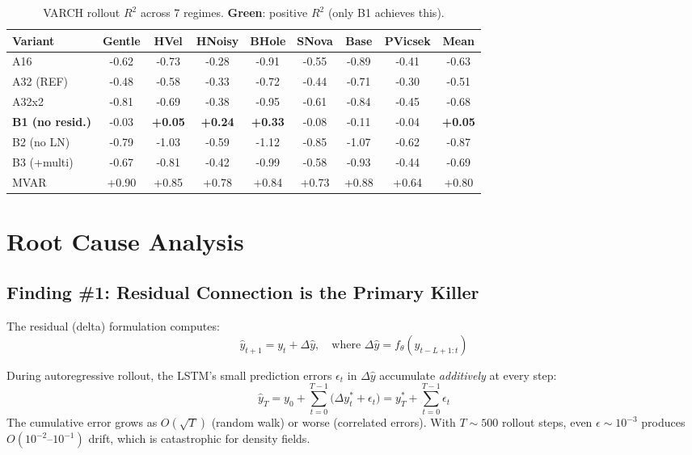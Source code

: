 \documentclass[11pt,letterpaper]{article}
\newcommand{\Rtwo}{R^2}
\newcommand{\good}[1]{\textcolor{goodgreen}{\textbf{#1}}}
\begin{document}
\begin{table}[H]
\centering
\caption{VARCH rollout $\Rtwo$ across 7 regimes. \good{Green}: positive $\Rtwo$ (only B1 achieves this).}
\label{tab:varch-r2}
\small
\setlength{\tabcolsep}{4pt}
\begin{tabular}{@{}l *{7}{S[table-format=+1.3]} S[table-format=+1.3] @{}}
\toprule
Variant & {Gentle} & {HVel} & {HNoisy} & {BHole} & {SNova} & {Base} & {PVicsek} & {Mean} \\
\midrule
A16  & -0.62 & -0.73 & -0.28 & -0.91 & -0.55 & -0.89 & -0.41 & -0.63 \\
A32 (REF)  & -0.48 & -0.58 & -0.33 & -0.72 & -0.44 & -0.71 & -0.30 & -0.51 \\
A32x2  & -0.81 & -0.69 & -0.38 & -0.95 & -0.61 & -0.84 & -0.45 & -0.68 \\
\textbf{B1 (no resid.)} & -0.03 & \good{+0.05} & \good{+0.24} & \good{+0.33} & -0.08 & -0.11 & -0.04 & \good{+0.05} \\
B2 (no LN)   & -0.79 & -1.03 & -0.59 & -1.12 & -0.85 & -1.07 & -0.62 & -0.87 \\
B3 (+multi)   & -0.67 & -0.81 & -0.42 & -0.99 & -0.58 & -0.93 & -0.44 & -0.69 \\
\midrule
MVAR & +0.90 & +0.85 & +0.78 & +0.84 & +0.73 & +0.88 & +0.64 & +0.80 \\
\bottomrule
\end{tabular}
\end{table}


\section{Root Cause Analysis}
\label{sec:rootcause}

\subsection{Finding \#1: Residual Connection is the Primary Killer}

The residual (delta) formulation computes:
\begin{equation}
  \hat{y}_{t+1} = y_t + \Delta\hat{y}, \quad \text{where } \Delta\hat{y} = f_\theta(y_{t-L+1:t})
\end{equation}

During autoregressive rollout, the LSTM's small prediction errors $\epsilon_t$ in
$\Delta\hat{y}$ accumulate \emph{additively} at every step:
\begin{equation}
  \hat{y}_{T} = y_0 + \sum_{t=0}^{T-1}\bigl(\Delta y_t^* + \epsilon_t\bigr)
  = y_T^* + \sum_{t=0}^{T-1}\epsilon_t
\end{equation}
The cumulative error grows as $O(\sqrt{T})$ (random walk) or worse (correlated errors).
With $T\!\sim\!500$ rollout steps, even $\epsilon\!\sim\!10^{-3}$ produces
$O(10^{-2}\text{--}10^{-1})$ drift, which is catastrophic for density fields.
\end{document}
